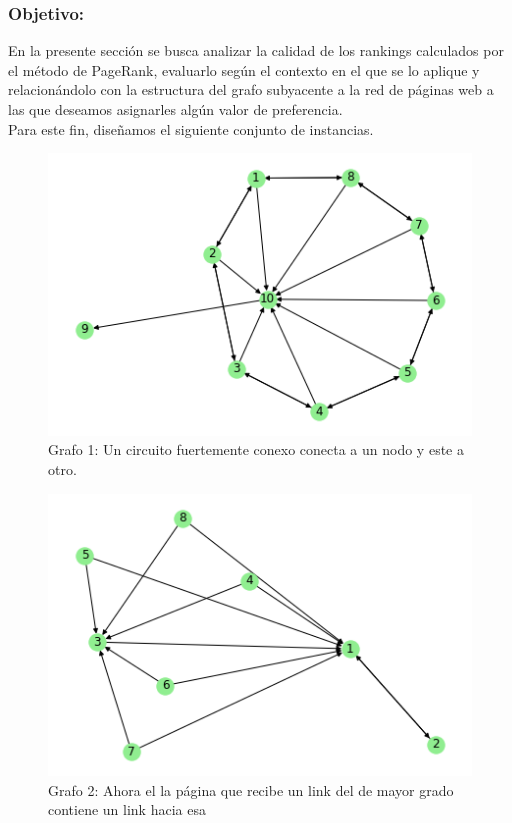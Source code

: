 \subsubsection{Objetivo:}

En la presente sección se busca analizar la calidad de los rankings calculados por el método de PageRank, evaluarlo según el contexto en el que se lo aplique y relacionándolo con la estructura del grafo subyacente a la red de páginas web a las que deseamos asignarles algún valor de preferencia. \\

Para este fin, diseñamos el siguiente conjunto de instancias. \\

\begin{figure}
   \begin{center}
     \includegraphics{img/prueba-circular.png} 
  \end{center}
\caption{Grafo 1: Un circuito fuertemente conexo conecta a un nodo y este a otro.} \label{fig:exp3-circular}
\end{figure}

\begin{figure}
   \begin{center}
     \includegraphics{img/prueba_grafo_2.png} 
  \end{center}
\caption{Grafo 2: Ahora el la página que recibe un link del de mayor grado contiene un link hacia esa} \label{fig:exp3-grafo2}
\end{figure}

